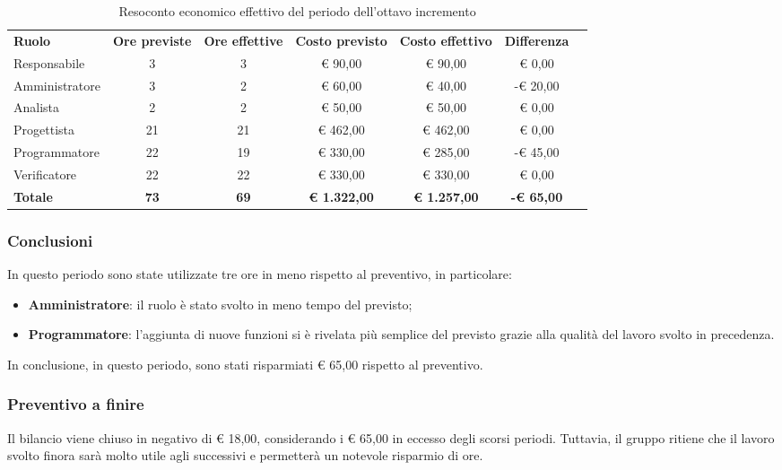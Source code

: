 \documentclass[../piano-di-progetto.tex]{subfiles}
\begin{document}
  \begin{table}[H]
    \centering
    \begin{tabular}{lcccccc}
      \rowcolor{lightgray}
      \textbf{Ruolo}  & \textbf{Ore previste} & \textbf{Ore effettive} & \textbf{Costo previsto} & \textbf{Costo effettivo} & \textbf{Differenza} \\
Responsabile    & 3           & 3           & € 90,00             & € 90,00             & € 0,00            \\
Amministratore  & 3           & 2           & € 60,00             & € 40,00             & -€ 20,00          \\
Analista        & 2           & 2           & € 50,00             & € 50,00             & € 0,00            \\
Progettista     & 21          & 21          & € 462,00            & € 462,00            & € 0,00            \\
Programmatore   & 22          & 19          & € 330,00            & € 285,00            & -€ 45,00          \\
Verificatore    & 22          & 22          & € 330,00            & € 330,00            & € 0,00            \\
\textbf{Totale} & \textbf{73} & \textbf{69} & \textbf{€ 1.322,00} & \textbf{€ 1.257,00} & \textbf{-€ 65,00}

    \end{tabular}
    \caption{Resoconto economico effettivo del periodo dell'ottavo incremento}
  \end{table}
\subsubsection{Conclusioni}
In questo periodo sono state utilizzate tre ore in meno rispetto al preventivo, in particolare:


\begin{itemize}
    \item \textbf{Amministratore}: il ruolo è stato svolto in meno tempo del previsto;
    \item \textbf{Programmatore}: l'aggiunta di nuove funzioni si è rivelata più semplice del previsto grazie alla qualità del lavoro svolto in precedenza.
\end{itemize}
In conclusione, in questo periodo, sono stati risparmiati € 65,00 rispetto al preventivo.

\subsubsection{Preventivo a finire}
Il bilancio viene chiuso in negativo di € 18,00, considerando i € 65,00 in eccesso degli scorsi periodi. Tuttavia, il gruppo ritiene che il lavoro svolto finora sarà molto utile agli successivi e permetterà un notevole risparmio di ore.
\end{document}
